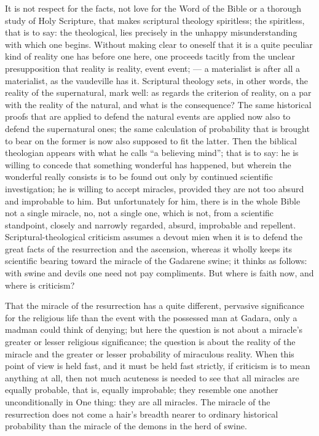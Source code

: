 \documentclass[12pt,a4paper,openany]{book}
\newcommand{\opage}[1]{\marginnote{\footnotesize\textit{[#1]}}}
\begin{document}
It is not respect for the facts, not
love for the Word of the Bible or a thorough study of
Holy Scripture, that makes scriptural theology spiritless; the
spiritless, that is to say: the theological, lies precisely in the
unhappy misunderstanding with which one begins. Without
making clear to oneself that it is a quite peculiar kind of
reality one has before one here, one proceeds tacitly
from the unclear presupposition that reality is reality,
event event; --- a materialist is after all a materialist,
as the vaudeville has it. Scriptural theology
sets, in other words, the reality of the supernatural,
mark well: as regards the criterion of reality,
\setcounter{footnote}{0}%
\opage{5}on a par with the reality of the natural, and
what is the consequence? The same historical proofs that
are applied to defend the natural events are applied
now also to defend the supernatural ones; the same
calculation of probability that is brought to bear on the former is now
also supposed to fit the latter. Then the biblical theologian
appears with what he calls ``a believing mind''; that is to say: he
is willing to concede that something wonderful has happened,
but wherein the wonderful really consists is to be
found out only by continued scientific investigation; he
is willing to accept miracles, provided they are not too
absurd and improbable to him. But unfortunately for him, there
is in the whole Bible not a single miracle, no, not a
single one, which is not, from a scientific standpoint, closely and
narrowly regarded, absurd, improbable and repellent.
Scriptural-theological criticism assumes a devout mien
when it is to defend the great facts of the resurrection and the ascension,
whereas it wholly keeps its
scientific bearing toward the miracle of the Gadarene
swine; it thinks as follows: with swine and devils
one need not pay compliments. But where is
faith now, and where is criticism?

That the miracle of the resurrection has a quite different, pervasive
significance for the religious life than the event
with the possessed man at Gadara, only a madman
could think of denying; but here the question is not
about a miracle's greater or lesser religious significance;
the question is about the reality of the miracle and the greater or lesser
probability of miraculous
reality. When this point of view is held fast, and it must be held fast strictly,
if criticism is to mean anything at all, then
\setcounter{footnote}{0}%
\opage{6}not much acuteness is needed to see that
all miracles are equally probable, that is, equally improbable;
they resemble one another unconditionally in One thing: they are all miracles.
The miracle of the resurrection does not come a hair's breadth nearer
to ordinary historical probability
than the miracle of the demons in the herd of swine.
\end{document}
